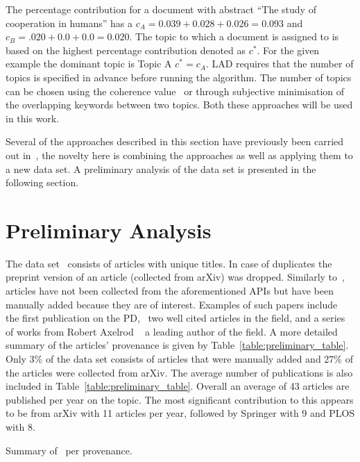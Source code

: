 \documentclass{article}
\theoremstyle{definition}
\newcommand{\totalarticles}{}
\newcommand{\manual}{}
\begin{document}
The percentage contribution for a document with abstract ``The study of
cooperation in humans'' has a \(c_{A} = 0.039 + 0.028 + 0.026 = 0.093\) and
\(c_B = .020 + 0.0 + 0.0 = 0.020\). The topic to which a document is assigned to
is based on the highest percentage contribution denoted as \(c^*\). For the
given example the dominant topic is Topic A \(c^*=c_A\). LAD requires that
the number of topics is specified in advance before running the algorithm. The
number of topics can be chosen using the coherence value~\cite{Roder2015} or
through subjective minimisation of the overlapping keywords between two topics.
Both these approaches will be used in this work.

Several of the approaches described in this section have previously been
carried out in~\cite{Bergmann2018,Liu2015,Sugimoto2011, youngblood2018},
the novelty here is combining the approaches as well as applying them
to a new data set. A preliminary analysis of the data set is presented in the
following section.

\section{Preliminary Analysis}\label{section:preliminary}

The data set~\cite{pd_data_2018} consists of \totalarticles articles with unique
titles. In case of duplicates the preprint version of an article (collected from
arXiv) was dropped. Similarly to~\cite{Liu2015}, \manual articles have not been
collected from the aforementioned APIs but have been manually added because they
are of interest. Examples of such papers include~\cite{Flood1958}
the first publication on the PD,~\cite{Ohtsuki2006, Stewart2012} two well cited
articles in the field, and a series of works from Robert Axelrod
~\cite{Axelrod1981, Riolo2001} a
leading author of the field. A more detailed summary of the articles' provenance
is given by Table~\ref{table:preliminary_table}. Only 3\% of the data set consists of
articles that were manually added and 27\% of the articles were collected from
arXiv. The average number of publications is also included in
Table~\ref{table:preliminary_table}. Overall an average of 43 articles are published
per year on the topic. The most significant contribution to this appears to be
from arXiv with 11 articles per year, followed by Springer with 9 and PLOS with
8.

\begin{table}[!hbtp]
    \begin{center}
    \resizebox{.9\textwidth}{!}{
    }
    \end{center}
    \caption{Summary of~\cite{pd_data_2018} per provenance.}
    \label{table:preliminary_table}
\end{table}
\end{document}
